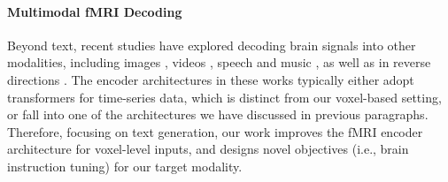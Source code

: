 \paragraph{Multimodal fMRI Decoding}
Beyond text, recent studies have explored decoding brain signals into other modalities, including images \citep{scotti2024mindeye2, wang2024mindbridge,chen2023seeingbrainconditionaldiffusion}, videos \citep{sun2024neurocinedecodingvividvideo,chen2023cinematicmindscapeshighqualityvideo}, speech \citep{chen2024open} and music \citep{denk2023brain2musicreconstructingmusichuman}, as well as in reverse directions \citep{toneva2019interpreting}. The encoder architectures in these works typically either adopt transformers for time-series data, which is distinct from our voxel-based setting, or fall into one of the architectures we have discussed in previous paragraphs. Therefore, focusing on text generation, our work improves the fMRI encoder architecture for voxel-level inputs, and designs novel objectives (i.e., brain instruction tuning) for our target modality.

